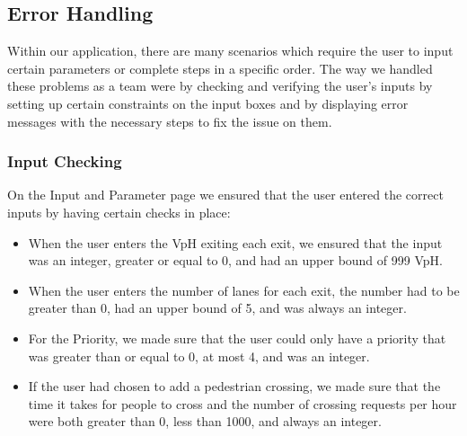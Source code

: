 \documentclass{article}
\begin{document}
    \subsection{Error Handling}
    Within our application, there are many scenarios which require the user to input certain parameters or complete steps in a specific order. The way we handled these problems as a team were by checking and verifying the user's inputs by setting up certain constraints on the input boxes and by displaying error messages with the necessary steps to fix the issue on them.
    \subsubsection{Input Checking}
    On the Input and Parameter page we ensured that the user entered the correct inputs by having certain checks in place:
    \begin{itemize}
        \item When the user enters the VpH exiting each exit, we ensured that the input was an integer, greater or equal to 0, and had an upper bound of 999 VpH.
        \item When the user enters the number of lanes for each exit, the number had to be greater than 0, had an upper bound of 5, and was always an integer.
        \item For the Priority, we made sure that the user could only have a priority that was greater than or equal to 0, at most 4, and was an integer.
        \item If the user had chosen to add a pedestrian crossing, we made sure that the time it takes for people to cross and the number of crossing requests per hour were both greater than 0, less than 1000, and always an integer.
    \end{itemize}
\end{document}

